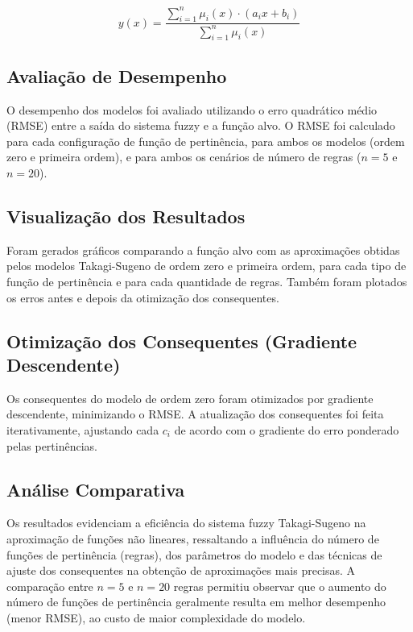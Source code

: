 \[
y(x) = \frac{\sum_{i=1}^{n} \mu_i(x) \cdot (a_i x + b_i)}{\sum_{i=1}^{n} \mu_i(x)}
\]

\subsection{Avaliação de Desempenho}

O desempenho dos modelos foi avaliado utilizando o erro quadrático médio (RMSE) entre a saída do sistema fuzzy e a função alvo. O RMSE foi calculado para cada configuração de função de pertinência, para ambos os modelos (ordem zero e primeira ordem), e para ambos os cenários de número de regras ($n=5$ e $n=20$).

\subsection{Visualização dos Resultados}

Foram gerados gráficos comparando a função alvo com as aproximações obtidas pelos modelos Takagi-Sugeno de ordem zero e primeira ordem, para cada tipo de função de pertinência e para cada quantidade de regras. Também foram plotados os erros antes e depois da otimização dos consequentes.

\subsection{Otimização dos Consequentes (Gradiente Descendente)}

Os consequentes do modelo de ordem zero foram otimizados por gradiente descendente, minimizando o RMSE. A atualização dos consequentes foi feita iterativamente, ajustando cada $c_i$ de acordo com o gradiente do erro ponderado pelas pertinências.

\subsection{Análise Comparativa}

Os resultados evidenciam a eficiência do sistema fuzzy Takagi-Sugeno na aproximação de funções não lineares, ressaltando a influência do número de funções de pertinência (regras), dos parâmetros do modelo e das técnicas de ajuste dos consequentes na obtenção de aproximações mais precisas. A comparação entre $n=5$ e $n=20$ regras permitiu observar que o aumento do número de funções de pertinência geralmente resulta em melhor desempenho (menor RMSE), ao custo de maior complexidade do modelo.